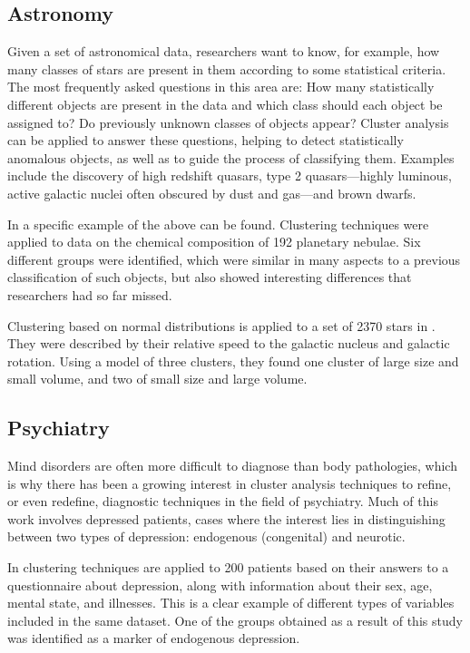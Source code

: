 \subsection{Astronomy}

Given a set of astronomical data, researchers want to know, for example, how many classes of stars are present in them according to some statistical criteria. The most frequently asked questions in this area are: How many statistically different objects are present in the data and which class should each object be assigned to? Do previously unknown classes of objects appear? Cluster analysis can be applied to answer these questions, helping to detect statistically anomalous objects, as well as to guide the process of classifying them. Examples include the discovery of high redshift quasars, type 2 quasars---highly luminous, active galactic nuclei often obscured by dust and gas---and brown dwarfs.

In \cite{faundez1996classification} a specific example of the above can be found. Clustering techniques were applied to data on the chemical composition of 192 planetary nebulae. Six different groups were identified, which were similar in many aspects to a previous classification of such objects, but also showed interesting differences that researchers had so far missed.

Clustering based on normal distributions is applied to a set of 2370 stars in \cite{celeux1992classification}. They were described by their relative speed to the galactic nucleus and galactic rotation. Using a model of three clusters, they found one cluster of large size and small volume, and two of small size and large volume.

\subsection{Psychiatry}

Mind disorders are often more difficult to diagnose than body pathologies, which is why there has been a growing interest in cluster analysis techniques to refine, or even redefine, diagnostic techniques in the field of psychiatry. Much of this work involves depressed patients, cases where the interest lies in distinguishing between two types of depression: endogenous (congenital) and neurotic.

In \cite{pledger2008using} clustering techniques are applied to 200 patients based on their answers to a questionnaire about depression, along with information about their sex, age, mental state, and illnesses. This is a clear example of different types of variables included in the same dataset. One of the groups obtained as a result of this study was identified as a marker of endogenous depression.

